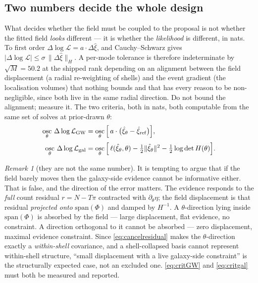 \documentclass[11pt]{article}
\theoremstyle{definition}
\theoremstyle{remark}
\newtheorem{remark}{Remark}
\newcommand{\osc}{\mathop{\mathrm{osc}}}
\begin{document}
\subsection{Two numbers decide the whole design}
\label{sec:criterion}

What decides whether the field must be coupled to the proposal is not whether the
fitted field \emph{looks} different --- it is whether the \emph{likelihood} is
different, in nats. To first order $\Delta\log\mathcal L=a\cdot\Delta\hat\xi$, and
Cauchy--Schwarz gives $|\Delta\log\mathcal L|\le\sigma\,\|\Delta\hat\xi\|_H$. A
per-mode tolerance is therefore indeterminate by $\sqrt M=50.2$ at the shipped
rank depending on an
alignment between the field displacement (a radial re-weighting of shells) and the
event gradient (the localisation volumes) that nothing bounds and that has every
reason to be non-negligible, since both live in the same radial direction. Do not
bound the alignment; measure it. The two criteria, both in nats, both computable
from the same set of solves at prior-drawn $\theta$:
\begin{align}
  \osc_\theta\,\Delta\log\mathcal L_{\rm GW}
  &=\osc_\theta\Big[\,a\cdot\big(\hat\xi_\theta-\hat\xi_{\rm ref}\big)\Big],
  \label{eq:critGW}\\[2pt]
  \osc_\theta\,\Delta\log\mathcal L_{\rm gal}
  &=\osc_\theta\Big[\,\ell(\hat\xi_\theta,\theta)-\tfrac12\|\hat\xi_\theta\|^2
      -\tfrac12\log\det H(\theta)\Big].
  \label{eq:critgal}
\end{align}

\begin{remark}[they are not the same number]
\label{rem:notsame}
It is tempting to argue that if the field barely moves then the galaxy-side
evidence cannot be informative either. That is false, and the direction of the
error matters. The evidence responds to the \emph{full} count residual
$r=N-T\pi$ contracted with $\partial_\theta\eta$; the field displacement is that
residual \emph{projected onto} $\mathrm{span}(\Phi)$ and damped by $H^{-1}$. A
$\theta$-direction lying inside $\mathrm{span}(\Phi)$ is absorbed by the field ---
large displacement, flat evidence, no constraint. A direction orthogonal to it
cannot be absorbed --- zero displacement, maximal evidence constraint. Since
\eqref{eq:cancelresidual} makes the $\theta$-direction exactly a \emph{within-shell}
covariance, and a shell-collapsed basis cannot represent within-shell structure,
``small displacement with a live galaxy-side constraint'' is the structurally
expected case, not an excluded one. \eqref{eq:critGW} and \eqref{eq:critgal} must
both be measured and reported.
\end{remark}
\end{document}

